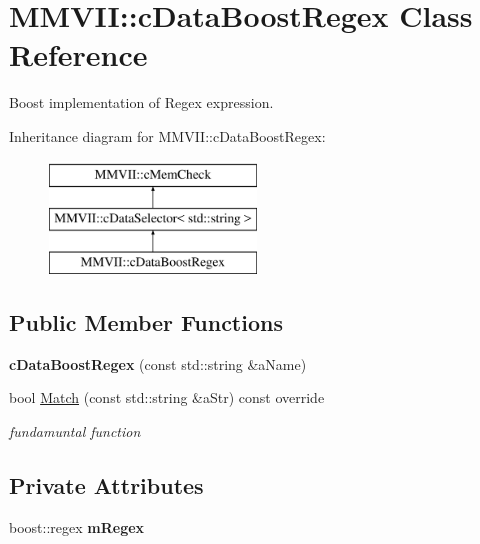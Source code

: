 \hypertarget{classMMVII_1_1cDataBoostRegex}{}\section{M\+M\+V\+II\+:\+:c\+Data\+Boost\+Regex Class Reference}
\label{classMMVII_1_1cDataBoostRegex}


Boost implementation of Regex expression.  


Inheritance diagram for M\+M\+V\+II\+:\+:c\+Data\+Boost\+Regex\+:\begin{figure}[H]
\begin{center}
\leavevmode
\includegraphics[height=3.000000cm]{classMMVII_1_1cDataBoostRegex}
\end{center}
\end{figure}
\subsection*{Public Member Functions}
\begin{DoxyCompactItemize}
\item 
{\bfseries c\+Data\+Boost\+Regex} (const std\+::string \&a\+Name)\hypertarget{classMMVII_1_1cDataBoostRegex_a74c21faec8caba9eab999d18b99f2086}{}\label{classMMVII_1_1cDataBoostRegex_a74c21faec8caba9eab999d18b99f2086}

\item 
bool \hyperlink{classMMVII_1_1cDataBoostRegex_aa46e7a4dfbbe14e6f6f5f5a6633b1a8a}{Match} (const std\+::string \&a\+Str) const override\hypertarget{classMMVII_1_1cDataBoostRegex_aa46e7a4dfbbe14e6f6f5f5a6633b1a8a}{}\label{classMMVII_1_1cDataBoostRegex_aa46e7a4dfbbe14e6f6f5f5a6633b1a8a}

\begin{DoxyCompactList}\small\item\em fundamuntal function \end{DoxyCompactList}\end{DoxyCompactItemize}
\subsection*{Private Attributes}
\begin{DoxyCompactItemize}
\item 
boost\+::regex {\bfseries m\+Regex}\hypertarget{classMMVII_1_1cDataBoostRegex_aa9f6543d957204b8130ce82667c6d992}{}\label{classMMVII_1_1cDataBoostRegex_aa9f6543d957204b8130ce82667c6d992}

\end{DoxyCompactItemize}


